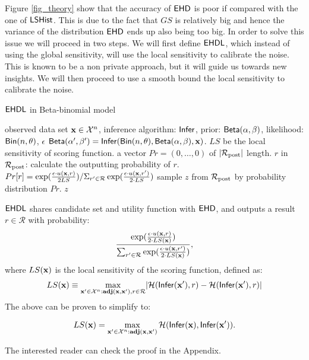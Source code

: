 \documentclass{article}
\begin{document}
Figure \ref{fig_theory} show that  the accuracy of $\mathsf{EHD}$ is poor if compared with the one of $\mathsf{LSHist}$. This is due to the fact that
$GS$ is relatively big and hence the variance of the distribution $\mathsf{EHD}$ ends up also being too big. In order to solve this issue we
will proceed in two steps. We will first define $\mathsf{EHDL}$, which instead of using the global sensitivity, will use the local sensitivity to calibrate
the noise. This is known to be a non private approach, but it will guide us towards new insights.
We will then proceed to use a smooth bound the local sensitivity to
calibrate the noise.

  \begin{algorithm}
  \caption{$\mathsf{EHDL}$ in Beta-binomial model}
  \label{mech:expmech}
  \begin{algorithmic}
  \INPUT observed data set $\textbf{x} \in \mathcal{X}^n$, inference algorithm: $\mathsf{Infer}$, 
  prior: $\mathsf{Beta}(\alpha, \beta)$, likelihood: $\mathsf{Bin}(n, \theta)$, $\epsilon$
  \STATE {} $\mathsf{Beta}(\alpha', \beta') = \mathsf{Infer}(\mathsf{Bin}(n, \theta), \mathsf{Beta}(\alpha, \beta), \textbf{x})$. $LS$ be the local sensitivity of scoring function.  
  \STATE {} a vector $Pr = (0, \dots, 0 )$ of $|\mathcal{R}_{\textup{post}}|$ length.
  \STATE {} $r$ in $\mathcal{R}_{\textup{post}}$:
  \STATE \quad \quad calculate the outputting probability of $r$.
  \STATE \quad \quad $Pr[r] = 
  {\exp(\frac{\epsilon\cdot u(\textbf{x}, {r})}{2 LS})}
/ {\Sigma_{r' \in \mathcal{R}}\exp(\frac{\epsilon\cdot u(\textbf{x}, {r'})}{2\cdot LS})}$
\STATE \quad sample $z$ from $\mathcal{R}_{\textup{post}}$ by probability distribution $Pr$.
   $z$
  \end{algorithmic}
  \end{algorithm}


$\mathsf{EHDL}$ shares candidate set and utility function with $\mathsf{EHD}$,
and outputs a result $r \in \mathcal{R}$ with probability:
\[
\frac
  {\exp(\frac{\epsilon \cdot u(\textbf{x}, {r})}{2\cdot LS(\textbf{x})})}
{\sum_{r' \in \mathcal{R}}\exp(\frac{\epsilon\cdot u(\textbf{x}, {r'})}{2\cdot LS(\textbf{x})})},
\]
where $LS(\textbf{x})$ is the local sensitivity of the scoring function, defined as:
\begin{equation}\label{eq:local_sensitivity_scoring}
LS(\textbf{x})\equiv\max_{\textbf{x}' \in \mathcal{X}^n: \\ \textbf{adj}(\textbf{x},\textbf{x}'), r\in \mathcal{R}}\lvert \mathcal{H}(\mathsf{Infer}(\textbf{x}'), r) - \mathcal{H}(\mathsf{Infer}(\textbf{x}'), r)\rvert 
\end{equation}
The above can be proven to simplify to:
\begin{lem}
\label{lem_loc_opt}
\[
LS(\textbf{x}) = \max\limits_{\textbf{x}' \in \mathcal{X}^n:\textbf{adj}(\textbf{x},\textbf{x}')} \mathcal{H}(\mathsf{Infer}(\textbf{x}), \mathsf{Infer}(\textbf{x}')).
\]
\end{lem}
The interested reader can check the proof in the Appendix.
\end{document}
